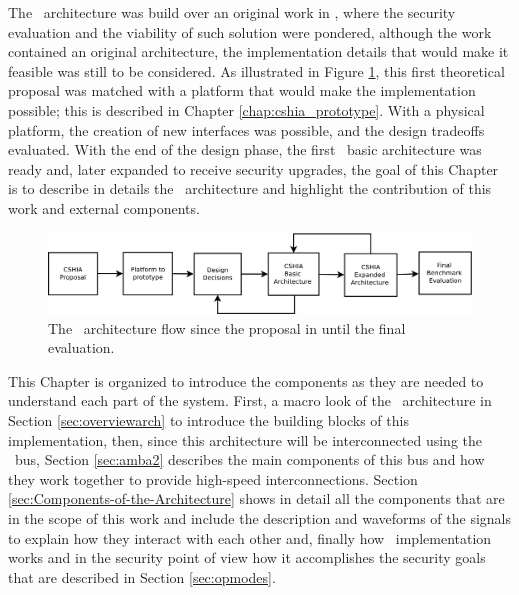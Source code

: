 

The \cshia~architecture was build over an original work in  \cite{Hoffman2015}, where the security evaluation and the viability of such solution were pondered, although the work contained an original architecture, the implementation details that would make it feasible was still to be considered.  As illustrated in Figure \ref{fig:cshiaflow}, this first theoretical proposal was matched with a platform that would make the implementation possible; this is described in Chapter \ref{chap:cshia_prototype}.  With a physical platform, the creation of new interfaces was possible, and the design tradeoffs evaluated. With the end of the design phase, the first \cshia~basic architecture was ready and, later expanded to receive security upgrades, the goal of this Chapter is to describe in details the \cshia~architecture and highlight the contribution of this work and external components.
\begin{figure}[!ht]
    \centering
    \includegraphics[width=\textwidth]{figures/pdf/arch_flow.pdf}
    \caption{The \cshia~architecture flow since the proposal in \cite{Hoffman2015} until the final evaluation.}
    \label{fig:cshiaflow}
\end{figure}


This Chapter is organized to introduce the components as they are needed to understand each part of the system. First, a macro look of the \cshia~architecture  in Section \ref{sec:overviewarch} to introduce the building blocks of this implementation, then, since this architecture will be interconnected using the \amba~bus, Section \ref{sec:amba2} describes the main components of this bus and how they work together to provide high-speed interconnections. Section \ref{sec:Components-of-the-Architecture} shows in detail all the components that are in the scope of this work and include the description and  waveforms of the signals to explain how they interact with each other and, finally how \cshia~implementation works and in the security point of view  how it accomplishes  the security goals that are described in Section \ref{sec:opmodes}.

